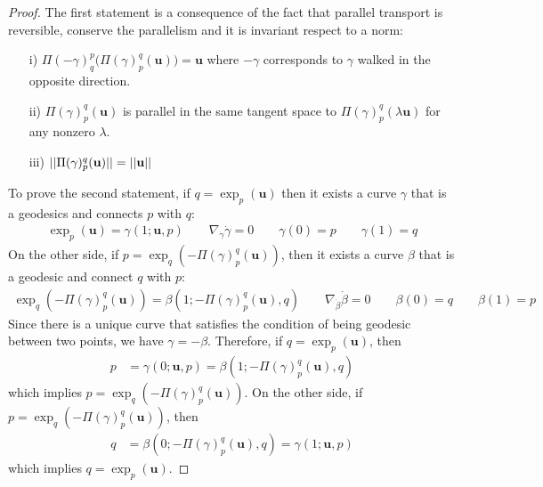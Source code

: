 \begin{proof}
	The first statement is a consequence of the fact that parallel transport is reversible, conserve the parallelism and it is invariant respect to a norm: 
	\begin{enumerate}
		\item[i)] $\Pi(-\gamma)_{q}^{p}\Big(\Pi(\gamma)_{p}^{q}(\mathbf{u})\Big) = \mathbf{u}$ where $-\gamma$ corresponds to $\gamma$ walked in the opposite direction.
		\item[ii)] $\Pi(\gamma)_{p}^{q}(\mathbf{u})$ is parallel in the same tangent space to $\Pi(\gamma)_{p}^{q}(\lambda \mathbf{u})$ for any nonzero $\lambda$.
		\item[iii)] $\vert\lvert \Pi(\gamma)_{p}^{q}(\mathbf{u}) \rvert\vert = \vert\lvert \mathbf{u} \rvert\vert$ 
	\end{enumerate}
	To prove the second statement, if $q = \exp_{p}(\mathbf{u})$ then it exists a curve $\gamma$ that is a geodesics and connects $p$ with $q$:
	\begin{align*}
		\exp_{p}(\mathbf{u}) = \gamma(1;\mathbf{u}, p) 
		\qquad 
		\nabla_{\dot{\gamma}}\dot{\gamma}=0
		\qquad
		\gamma(0) = p
		\qquad
		\gamma(1) = q
	\end{align*}
	On the other side, if $p = \exp_{q}(-\Pi(\gamma)_{p}^{q}(\mathbf{u}))$, then it exists a curve $\beta$ that is a geodesic and connect $q$ with $p$: 
	\begin{align*}
		\exp_{q}(-\Pi(\gamma)_{p}^{q}(\mathbf{u}))= \beta(1;-\Pi(\gamma)_{p}^{q}(\mathbf{u}), q) 
		\qquad 
		\nabla_{\dot{\beta}}\dot{\beta}=0
		\qquad
		\beta(0) = q
		\qquad
		\beta(1) = p
	\end{align*}
	Since there is a unique curve that satisfies the condition of being geodesic between two points, we have $\gamma = -\beta$. Therefore, if $q = \exp_{p}(\mathbf{u})$, then
	\begin{align*}
		p &=  \gamma(0;\mathbf{u}, p) = \beta( 1;-\Pi(\gamma)_{p}^{q}(\mathbf{u}), q) 
	\end{align*}
	 which implies $p = \exp_{q}(-\Pi(\gamma)_{p}^{q}(\mathbf{u}))$. On the other side, if $p = \exp_{q}(-\Pi(\gamma)_{p}^{q}(\mathbf{u}))$, then 
	\begin{align*}
	q &= \beta( 0;-\Pi(\gamma)_{p}^{q}(\mathbf{u}), q)  = \gamma(1;\mathbf{u}, p) 
	\end{align*}
	which implies $q = \exp_{p}(\mathbf{u})$.
\end{proof}

